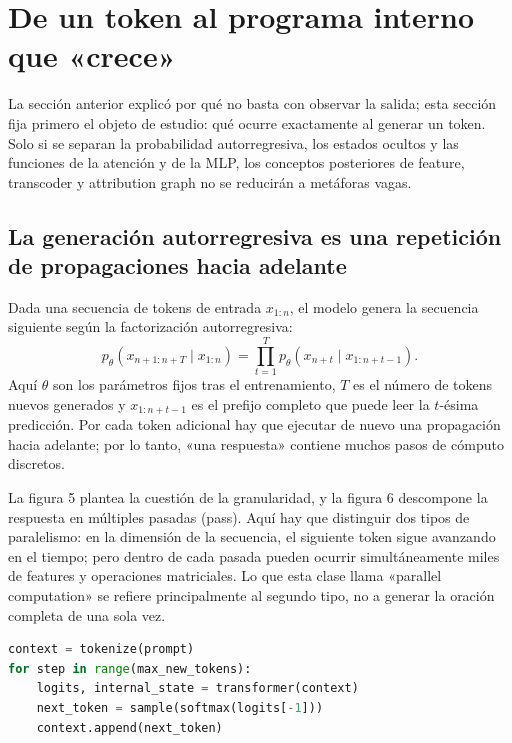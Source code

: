 \section{De un token al programa interno que «crece»}

La sección anterior explicó por qué no basta con observar la salida; esta sección fija primero el objeto de estudio: qué ocurre exactamente al generar un token. Solo si se separan la probabilidad autorregresiva, los estados ocultos y las funciones de la atención y de la MLP, los conceptos posteriores de feature, transcoder y attribution graph no se reducirán a metáforas vagas.

\subsection{La generación autorregresiva es una repetición de propagaciones hacia adelante}

Dada una secuencia de tokens de entrada $x_{1:n}$, el modelo genera la secuencia siguiente según la factorización autorregresiva:
\[
p_\theta(x_{n+1:n+T}\mid x_{1:n})
=\prod_{t=1}^{T}p_\theta(x_{n+t}\mid x_{1:n+t-1}).
\]
Aquí $\theta$ son los parámetros fijos tras el entrenamiento, $T$ es el número de tokens nuevos generados y $x_{1:n+t-1}$ es el prefijo completo que puede leer la $t$-ésima predicción. Por cada token adicional hay que ejecutar de nuevo una propagación hacia adelante; por lo tanto, «una respuesta» contiene muchos pasos de cómputo discretos.



La figura 5 plantea la cuestión de la granularidad, y la figura 6 descompone la respuesta en múltiples pasadas (pass). Aquí hay que distinguir dos tipos de paralelismo: en la dimensión de la secuencia, el siguiente token sigue avanzando en el tiempo; pero dentro de cada pasada pueden ocurrir simultáneamente miles de features y operaciones matriciales. Lo que esta clase llama «parallel computation» se refiere principalmente al segundo tipo, no a generar la oración completa de una sola vez.

\begin{lstlisting}[language=Python,caption={Pseudocódigo mínimo de decodificación autorregresiva: cada token corresponde a una nueva propagación hacia adelante}]
context = tokenize(prompt)
for step in range(max_new_tokens):
    logits, internal_state = transformer(context)
    next_token = sample(softmax(logits[-1]))
    context.append(next_token)
\end{lstlisting}

